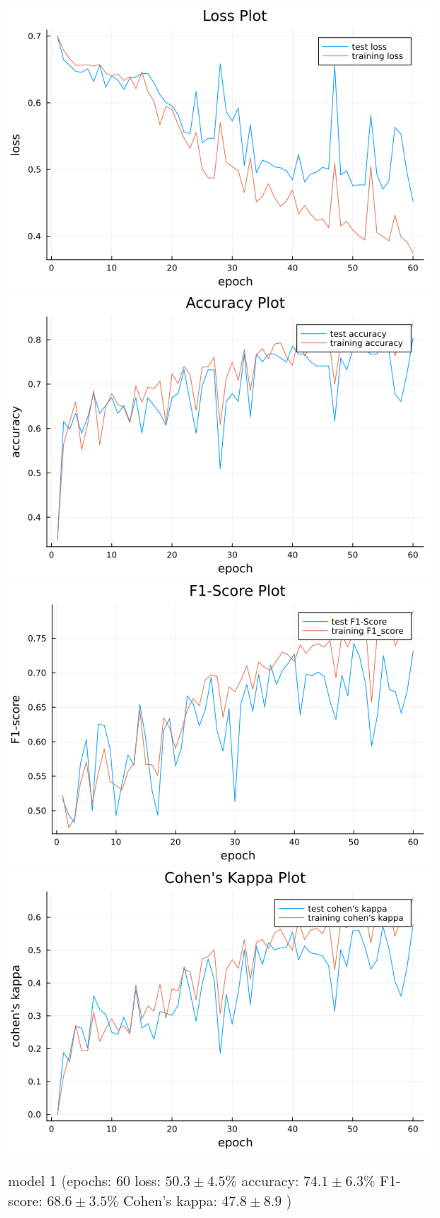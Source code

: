 \documentclass[
a4paper, 
12pt,
grayscalebody, %
abstract=on,
twoside, BCOR10mm, 12pt, DIV13,headinclude, footexclude, final, abstracton, openright
]{ibireprt}
\numberwithin{equation}{chapter}
\numberwithin{table}{chapter}
\numberwithin{figure}{chapter}
\numberwithin{algorithm}{chapter}
\numberwithin{example}{chapter}
\numberwithin{example}{chapter}
\begin{document}
\begin{figure}
	\includegraphics[width=0.4\linewidth]{loss_png_final_1_1.png}\hfill
	\includegraphics[width=0.4\linewidth]{accuracy_png_final_1_1.png}
	\\[\smallskipamount]
	\includegraphics[width=0.4\linewidth]{f1_score_png_final_1_1.png}\hfill
	\includegraphics[width=0.4\linewidth]{cohens_kappa_png_final_1_1.png}
	\caption{model 1 (epochs: 60 loss: $50.3 \pm 4.5\% $ accuracy: $74.1 \pm6.3\%$ F1-score: $68.6 \pm3.5\%$  Cohen's kappa: $47.8\pm8.9$ )}
\end{figure}
\end{document}
